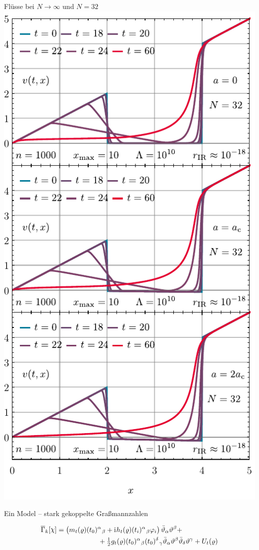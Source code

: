 \begin{frame}{Flüsse bei $N\rightarrow\infty$ und $N=32$}
	\includegraphics[width=0.36\framewidth]{../0d/figures/N32_flows.pdf} 
\end{frame}



\begin{frame}{Ein  Model -- stark gekoppelte Graßmannzahlen}
	\label{0dfermion}
	\centering

	\begin{align*}
		\FSeaa_\FSk[\MFchi]&=\del{\MFvtx{m}{\MFrho}\suIItij{0}{\alpha}{\beta}
		+\iu \MFvtx{h}{\MFrho}\suIItij{i}{\alpha}{\beta}\MFphi_i}\MFthetab_\alpha\MFtheta^\beta+\\
		&\qquad \qquad \qquad +\tfrac{1}{2}\MFvtx{g}{\MFrho}\suIItij{0}{\alpha}{\beta}\suIItij{0}{\delta}{\gamma}\MFthetab_\alpha\MFtheta^\beta\MFthetab_\delta\MFtheta^\gamma
		+ U_t(\MFrho)
	\end{align*}
\end{frame}
